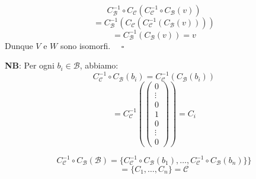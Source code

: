 \documentclass[a4paper]{article}
\theoremstyle{break}
\theoremstyle{break}
\theoremstyle{break}
\theoremstyle{break}
\begin{document}
\vspace{1em}
\[
  C_{\mathcal{B}}^{-1} \circ C_{\mathcal{C}}\left( C_{\mathcal{C}}^{-1} \circ C_{\mathcal{B}}(v) \right)
\] 
\[
= C_{\mathcal{B}}^{-1} \left( C_{\mathcal{C}} \left( C_{\mathcal{C}}^{-1} \left( C_{\mathcal{B}}(v) \right)  \right)  \right)
\] 
\[
= C_{\mathcal{B}}^{-1} \left( C_{\mathcal{B}}(v) \right) = v
\] 
Dunque \( V \) e \( W \) sono isomorfi. \( \quad \square \) 

\vspace{1em}
\noindent \textbf{NB}: Per ogni \( b_i \in \mathcal{B} \), abbiamo:
\[
  C_{\mathcal{C}}^{-1} \circ C_{\mathcal{B}}(b_i) = C_{\mathcal{C}}^{-1} \left(
    C_{\mathcal{B}}(b_i) \right) 
\] 
\[
  = C_{\mathcal{C}}^{-1} \left( \begin{pmatrix} 
      0\\
      \vdots\\
      0\\
      1\\
      0\\
      \vdots\\
      0
  \end{pmatrix}  \right) = C_i
\] 

\vspace{1em}
\[
  C_{\mathcal{C}}^{-1} \circ C_{\mathcal{B}}(\mathcal{B}) = \{C_{\mathcal{C}}^{-1} \circ C_{\mathcal{B}}(b_1),
    \ldots, C_{\mathcal{C}}^{-1} \circ C_{\mathcal{B}}(b_n)\}
\} 
\] 
\[
= \{C_1, \ldots, C_n\}  = \mathcal{C}
\] 
\end{document}
